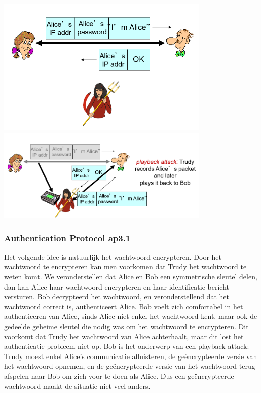 \includegraphics[width=4in]{./img/imghfdst8/hfdst8puntje16.png}\\[1cm]

\includegraphics[width=4in]{./img/imghfdst8/hfdst8puntje17.png}\\[1cm]

\clearpage

\subsubsection{Authentication Protocol ap3.1}

Het volgende idee is natuurlijk het wachtwoord encrypteren. Door het wachtwoord te encrypteren kan men voorkomen dat Trudy het wachtwoord te weten komt. We veronderstellen dat Alice en Bob een symmetrische sleutel delen, dan kan Alice haar wachtwoord encrypteren en haar identificatie bericht versturen. Bob decrypteerd het wachtwoord, en veronderstellend dat het wachtwoord correct is, authenticeert Alice. Bob voelt zich comfortabel in het authenticeren van Alice, sinds Alice niet enkel het wachtwoord kent, maar ook de gedeelde geheime sleutel die nodig was om het wachtwoord te encrypteren.
Dit voorkomt dat Trudy het wachtwoord van Alice achterhaalt, maar dit lost het authenticatie probleem niet op. Bob is het onderwerp van een playback attack: Trudy moest enkel Alice’s communicatie afluisteren, de geëncrypteerde versie van het wachtwoord opnemen, en de geëncrypteerde versie van het wachtwoord terug afspelen naar Bob om zich voor te doen als Alice. Dus een geëncrypteerde wachtwoord maakt de situatie niet veel anders.

